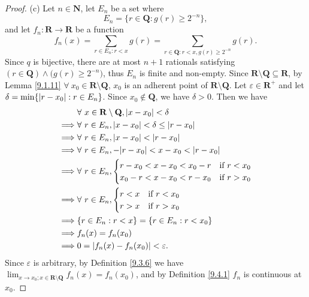 \begin{proof}{(c)}
    Let \(n \in \mathbf{N}\), let \(E_n\) be a set where
    \[
        E_n = \{r \in \mathbf{Q} : g(r) \geq 2^{-n}\},
    \]
    and let \(f_n : \mathbf{R} \to \mathbf{R}\) be a function
    \[
        f_n(x) = \sum_{r \in E_n : r < x} g(r) = \sum_{r \in \mathbf{Q} : r < x, g(r) \geq 2^{-n}} g(r).
    \]
    Since \(q\) is bijective, there are at most \(n + 1\) rationals satisfying \((r \in \mathbf{Q}) \land \big(g(r) \geq 2^{-n}\big)\), thus \(E_n\) is finite and non-empty.
    Since \(\mathbf{R} \setminus \mathbf{Q} \subseteq \mathbf{R}\), by Lemma \ref{9.1.11} \(\forall\ x_0 \in \mathbf{R} \setminus \mathbf{Q}\), \(x_0\) is an adherent point of \(\mathbf{R} \setminus \mathbf{Q}\).
    Let \(\varepsilon \in \mathbf{R}^+\) and let \(\delta = \min\{\abs*{r - x_0} : r \in E_n\}\).
    Since \(x_0 \notin \mathbf{Q}\), we have \(\delta > 0\).
    Then we have
    \begin{align*}
                 & \forall\ x \in \mathbf{R} \setminus \mathbf{Q}, \abs*{x - x_0} < \delta \\
        \implies & \forall\ r \in E_n, \abs*{x - x_0} < \delta \leq \abs*{r - x_0}         \\
        \implies & \forall\ r \in E_n, \abs*{x - x_0} < \abs*{r - x_0}                     \\
        \implies & \forall\ r \in E_n, -\abs*{r - x_0} < x - x_0 < \abs*{r - x_0}          \\
        \implies & \forall\ r \in E_n, \begin{cases}
            r - x_0 < x - x_0 < x_0 - r & \text{if } r < x_0 \\
            x_0 - r < x - x_0 < r - x_0 & \text{if } r > x_0
        \end{cases}                          \\
        \implies & \forall\ r \in E_n, \begin{cases}
            r < x & \text{if } r < x_0 \\
            r > x & \text{if } r > x_0
        \end{cases}                          \\
        \implies & \{r \in E_n : r < x\} = \{r \in E_n : r < x_0\}                         \\
        \implies & f_n(x) = f_n(x_0)                                                       \\
        \implies & 0 = \abs*{f_n(x) - f_n(x_0)} < \varepsilon.
    \end{align*}
    Since \(\varepsilon\) is arbitrary, by Definition \ref{9.3.6} we have \(\lim_{x \to x_0 ; x \in \mathbf{R} \setminus \mathbf{Q}} f_n(x) = f_n(x_0)\), and by Definition \ref{9.4.1} \(f_n\) is continuous at \(x_0\).


\end{proof}
